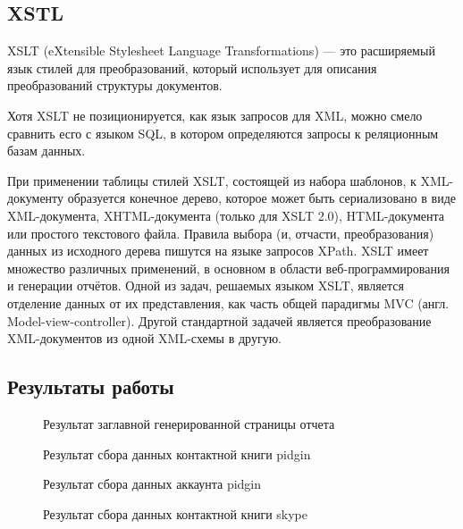 \subsection{XSTL}

XSLT (eXtensible Stylesheet Language Transformations) — это расширяемый язык стилей для преобразований, который использует для описания преобразований структуры документов.\cite{valikov}

Хотя XSLT не позиционируется, как язык запросов для XML, можно смело сравнить есго с языком SQL, в котором определяются запросы к реляционным базам данных.\cite{valikov}

При применении таблицы стилей XSLT, состоящей из набора шаблонов, к XML-документу образуется конечное дерево, которое может быть сериализовано в виде XML-документа, XHTML-документа (только для XSLT 2.0), HTML-документа или простого текстового файла. Правила выбора (и, отчасти, преобразования) данных из исходного дерева пишутся на языке запросов XPath.
XSLT имеет множество различных применений, в основном в области веб-программирования и генерации отчётов. Одной из задач, решаемых языком XSLT, является отделение данных от их представления, как часть общей парадигмы MVC (англ. Model-view-controller). Другой стандартной задачей является преобразование XML-документов из одной XML-схемы в другую.\cite{valikov}

\subsection{Результаты работы}

\begin{figure}[ht]
\caption{Результат заглавной генерированной страницы отчета}
\label{pic:xml_to_xslt1}
\end{figure}

\begin{figure}[ht]
\caption{Результат сбора данных контактной книги pidgin}
\label{pic:xml_to_xslt2}
\end{figure}

\begin{figure}[ht]
\caption{Результат сбора данных аккаунта pidgin}
\label{pic:xml_to_xslt3}
\end{figure}

\begin{figure}[ht]
\caption{Результат сбора данных контактной книги skype}
\label{pic:xml_to_xslt4}
\end{figure}

